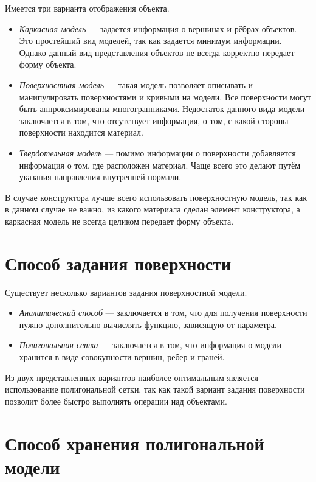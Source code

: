 Имеется три варианта отображения объекта.
\begin{itemize}[label=---]
    \item \textit{Каркасная модель} --- задается информация о вершинах и рёбрах объектов. Это простейший вид моделей, так как задается минимум информации. Однако данный вид представления объектов не всегда корректно передает форму объекта.
    \item \textit{Поверхностная модель} ---  такая модель позволяет описывать и манипулировать поверхностями и кривыми на модели. Все поверхности могут быть аппроксимированы многогранниками. Недостаток данного вида модели заключается в том, что отсутствует информация, о том, с какой стороны поверхности находится материал.
    \item \textit{Твердотельная модель} --- помимо информации о поверхности добавляется информация о том, где расположен материал. Чаще всего это делают путём указания направления внутренней нормали.
\end{itemize}

В случае конструктора лучше всего использовать поверхностную модель, так как в данном случае не важно, из какого материала сделан элемент конструктора, а каркасная модель не всегда целиком передает форму объекта.

\section{Способ задания поверхности}
Существует несколько вариантов задания поверхностной модели.
\begin{itemize}[label=---]
    \item \textit{Аналитический способ} --- заключается в том, что для получения поверхности нужно дополнительно вычислять функцию, зависящую от параметра.
    \item \textit{Полигональная сетка} --- заключается в том, что информация о модели хранится в виде совокупности вершин, ребер и граней.
\end{itemize}

Из двух представленных вариантов наиболее оптимальным является использование полигональной сетки, так как такой вариант задания поверхности позволит более быстро выполнять операции над объектами.

\section{Способ хранения полигональной модели}


